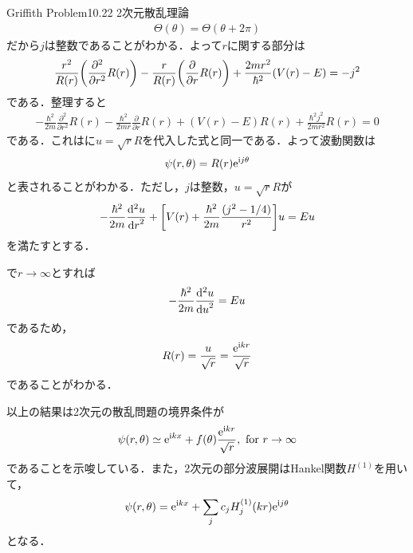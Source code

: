 \documentclass{report}
\begin{document}
\begin{myexc}{Griffith Problem10.22 2次元散乱理論}{}
\begin{align}
      \Theta(\theta) = \Theta(\theta + 2\pi)
    \end{align}
    だから$j$は整数であることがわかる．よって$r$に関する部分は
    \begin{align}
      \frac{r^2}{R(r)}\qty(\frac{\partial^2}{\partial r^2}R(r)) - \frac{r}{R(r)}\qty(\frac{\partial}{\partial r}R(r)) + \frac{2mr^2}{\hbar^2}(V(r) - E) = -j^2
    \end{align}
    である．整理すると
    \begin{align}
      -\frac{\hbar^2}{2m}\frac{\partial^2}{\partial r^2}R(r) - \frac{\hbar^2}{2mr}\frac{\partial}{\partial r}R(r) + (V(r) - E)R(r) + \frac{\hbar^2 j^2}{2mr^2}R(r) = 0
    \end{align}
    である．これはに$u=\sqrt{r}R$を代入した式と同一である．よって波動関数は
    \begin{align}
      \psi(r,\theta) = R(r)\mathrm{e}^{\mathrm{i} j\theta}
    \end{align}
    と表されることがわかる．ただし，$j$は整数，$u=\sqrt{r}R$が
    \begin{align}
      -\frac{\hbar^2}{2m}\frac{\mathrm{d}^2 u}{\dd{r}^2} + \qty[V(r) + \frac{\hbar^2}{2m}\frac{(j^2 - 1/4)}{r^2}]u = Eu
    \end{align}
    を満たすとする．
    
    で$r\to\infty$とすれば
    \begin{align}
      -\frac{\hbar^2}{2m}\frac{\mathrm{d}^2 u}{\dd{u}^2} = Eu
    \end{align}
    であるため，
    \begin{align}
      R(r) = \frac{u}{\sqrt{r}} = \frac{\mathrm{e}^{\mathrm{i} kr}}{\sqrt{r}}
    \end{align}
    であることがわかる．

    以上の結果は2次元の散乱問題の境界条件が
    \begin{align}
      \psi(r,\theta) \simeq \mathrm{e}^{\mathrm{i} kx} + f(\theta)\frac{\mathrm{e}^{\mathrm{i} kr}}{\sqrt{r}},\ \mathrm{for}\ r \to \infty
    \end{align}
    であることを示唆している．また，2次元の部分波展開はHankel関数$H^{(1)}$を用いて，
    \begin{align}
      \psi(r,\theta) = \mathrm{e}^{\mathrm{i} kx} + \sum_{j} c_j H^{(1)}_j (kr) \mathrm{e}^{\mathrm{i} j\theta}
    \end{align}
    となる．
  \end{myexc}
\end{document}
